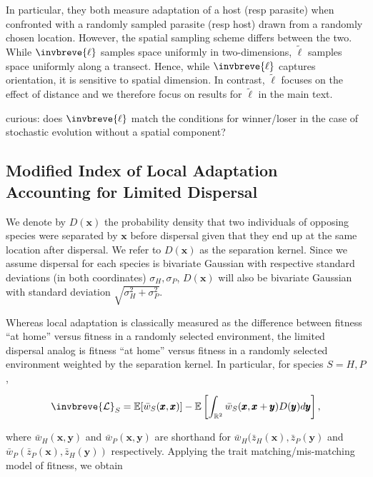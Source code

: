 \documentclass{article}
\begin{document}
In particular, they both measure adaptation of a host (resp parasite)
when confronted with a randomly sampled parasite (resp host) drawn from
a randomly chosen location. However, the spatial sampling scheme differs
between the two. While \(\invbreve{\ell}\) samples space uniformly in
two-dimensions, \(\tilde{\ell}\) samples space uniformly along a
transect. Hence, while \(\invbreve{\ell}\) captures orientation, it is
sensitive to spatial dimension. In contrast, \(\tilde{\ell}\) focuses on
the effect of distance and we therefore focus on results for
\(\tilde{\ell}\) in the main text.

curious: does \(\invbreve{\ell}\) match the conditions for winner/loser
in the case of stochastic evolution without a spatial component?

\hypertarget{modified-index-of-local-adaptation-accounting-for-limited-dispersal}{%
\subsection{Modified Index of Local Adaptation Accounting for Limited
Dispersal}\label{modified-index-of-local-adaptation-accounting-for-limited-dispersal}}

We denote by \(D(\pmb x)\) the probability density that two individuals
of opposing species were separated by \(\pmb x\) before dispersal given
that they end up at the same location after dispersal. We refer to
\(D(\pmb x)\) as the separation kernel. Since we assume dispersal for
each species is bivariate Gaussian with respective standard deviations
(in both coordinates) \(\sigma_H,\sigma_P\), \(D(\pmb x)\) will also be
bivariate Gaussian with standard deviation
\(\sqrt{\sigma_H^2+\sigma_P^2}\).

Whereas local adaptation is classically measured as the difference
between fitness ``at home'' versus fitness in a randomly selected
environment, the limited dispersal analog is fitness ``at home'' versus
fitness in a randomly selected environment weighted by the separation
kernel. In particular, for species \(S=H,P\),

\[\invbreve{\mathcal L}_S=\mathbb E[\bar w_S(\pmb x,\pmb x)]-\mathbb E\left[\int_{\mathbb R^2}\bar w_S(\pmb x,\pmb x+\pmb y)D(\pmb y)d\pmb y\right],\]

where \(\bar w_H(\pmb x,\pmb y)\) and \(\bar w_P(\pmb x,\pmb y)\) are
shorthand for \(\bar w_H(\bar z_H(\pmb x),\bar z_P(\pmb y)\) and
\(\bar w_P(\bar z_P(\pmb x),\bar z_H(\pmb y))\) respectively. Applying
the trait matching/mis-matching model of fitness, we obtain
\end{document}
